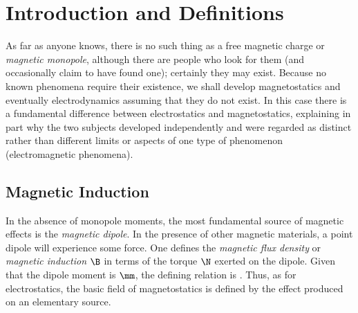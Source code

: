 




\section{Introduction and Definitions}
As far as anyone knows, there is no such thing as a free magnetic charge or
{\em magnetic monopole}, although there are people who look for them (and
occasionally claim to have found one); certainly they may exist. Because
no known phenomena require their existence, we shall
develop magnetostatics and eventually electrodynamics assuming that they do
not exist. In this case there is a fundamental difference between
electrostatics and magnetostatics, explaining in part why the two subjects
developed independently and were regarded as distinct rather than
different limits or aspects of one type of phenomenon (electromagnetic
phenomena). 

\subsection{Magnetic Induction}
In the absence of monopole moments, the most fundamental source
of magnetic effects is the {\em magnetic dipole}. In the presence of other
magnetic materials, a point dipole will experience some force. One
defines the {\em magnetic flux density} or {\em magnetic induction} $\B$ in
terms of the torque $\N$ exerted on the dipole. Given that the dipole
moment is $\mm$, the defining relation is
\beq
\N\equiv\mm\times\B.
\eeq
Thus, as for electrostatics, the basic field of magnetostatics is defined
by the effect produced on an elementary source.

